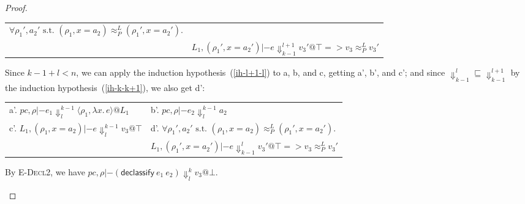 \documentclass{article}
\makeatletter
\theoremstyle{definition}
\newcommand{\at}{\ensuremath{{\scriptstyle{@}}}}
\newcommand{\pc}{\ensuremath{{\mathit{pc}}}}
\makeatother
\begin{document}
\begin{proof}
\begin{enumerate}
\begin{itemize}
\begin{center}
\begin{tabular*}{1.0\linewidth}{ll}
          $\forall{\rho_1', a_2' \text{ s.t. }
            (\rho_1, x = a_2) \approx^{L}_{P} (\rho_1', x = a_2')}.$
          \\ & \quad\quad
          $L_1, (\rho_1', x = a_2') |- e \Downarrow^{l+1}_{k-1} v_3' \at \top =>
          v_3 \approx^{L}_{P} v_3'$
        \end{tabular*}
      \end{center}
      Since $k-1 + l < n$, we can apply the induction
      hypothesis~(\ref{ih-l+1-l}) to a, b, and c, getting a', b', and c';
      and since $\Downarrow^{l}_{k-1} \sqsubseteq \Downarrow^{l+1}_{k-1}$
      by the induction hypothesis~(\ref{ih-k-k+1}), we also get d':
      \begin{center}
        \begin{tabular*}{1.0\linewidth}{ll}
          a'.
          $\pc, \rho |- e_1
          \Downarrow^{k-1}_{l}
          \langle{\rho_1, \lambda{x}.\, e\rangle} \at L_1$
          &
          b'.
          $\pc, \rho |- e_2
          \Downarrow^{k-1}_{l}
          a_2$
          \\[1.8ex]
          c'.
          $L_1, (\rho_1, x = a_2) |- e
          \Downarrow^{k-1}_{l}
          v_3 \at \top$
          &
          d'.
          $\forall{\rho_1', a_2' \text{ s.t. }
            (\rho_1, x = a_2) \approx^{L}_{P} (\rho_1', x = a_2')}.$
          \\ & \quad\quad
          $L_1, (\rho_1', x = a_2') |- e \Downarrow^{l}_{k-1} v_3' \at \top =>
          v_3 \approx^{L}_{P} v_3'$
        \end{tabular*}
      \end{center}
      By \textsc{E-Decl2}, we have
      $\pc, \rho |- (\mathsf{declassify}\ e_1\ e_2)
      \Downarrow^{k}_{l}
      v_3 \at \bot$.
      \qedhere
    \end{itemize}
  \end{enumerate}
\end{proof}
\end{document}
